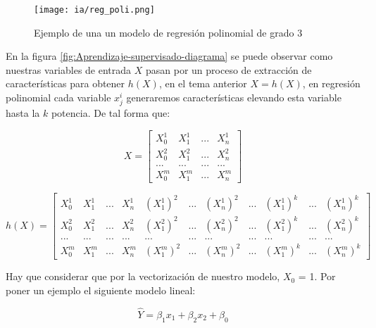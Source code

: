 \documentclass[11pt,fleqn]{book} %
\begin{document}
\begin{figure}[ht]
\centering\texttt{[image: ia/reg\_poli.png]}
\caption{Ejemplo de una un modelo de regresión polinomial de grado 3}

\label{fig:LinearRegressionPoli} 
\end{figure}

\FloatBarrier

En la figura \ref{fig:Aprendizaje-supervisado-diagrama} se puede observar como nuestras variables de entrada $X$ pasan por un proceso de extracción de características para obtener $h(X)$, en el tema anterior $X = h(X)$, en regresión polinomial cada variable $x_j^i$ generaremos características elevando esta variable hasta la $k$ potencia. De tal forma que:

\begin{equation}
     X=\begin{bmatrix}
         X_{0}^{1} &   X_{1}^{1} & ...  &   X_{n}^{1} \\
         X_{0}^{2} &   X_{1}^{2} & ...  &   X_{n}^{2} \\
         ... &   ... & ...  &   ... \\
         X_{0}^{m} &   X_{1}^{m} & ...  &   X_{n}^{m} 
     \end{bmatrix}
\end{equation}

\begin{equation}
     h(X)=\begin{bmatrix}
         X_{0}^{1} &   X_{1}^{1} & ...  &   X_{n}^{1}  & (X_{1}^{1})^2 & ...  & (X_{n}^{1})^2 & ... & (X_{1}^{1})^k  & ... & (X_{n}^{1})^k\\
         X_{0}^{2} &   X_{1}^{2} & ...  &   X_{n}^{2}  & (X_{1}^{2})^2 & ...  & (X_{n}^{2})^2 & ... & (X_{1}^{2})^k  & ... & (X_{n}^{2})^k\\
         ... & ... & ... & ... & ... & ...  &  ... & ... & ... & ... & ...\\
         X_{0}^{m} &   X_{1}^{m} & ...  &   X_{n}^{m} & (X_{1}^{m})^2 & ...  & (X_{n}^{m})^2 & ... & (X_{1}^{m})^k  & ... & (X_{n}^{m})^k
     \end{bmatrix}
\end{equation}

Hay que considerar que por la vectorización de nuestro modelo, $X_0$ = 1.
Por poner un ejemplo el siguiente modelo lineal:

\begin{equation}
\label{eqn:linear_regression_mod1}
\hat{Y}  = \beta _1 x_1 + \beta _2 x_2 + \beta _0
\end{equation}
\end{document}
